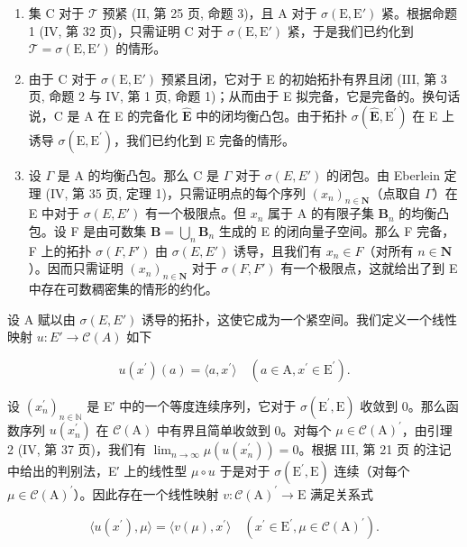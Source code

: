 \begin{enumerate}
\def\labelenumi{\Alph{enumi})}
\item
  集 C 对于 \(\mathcal{T}\) 预紧 (II, 第 25 页, 命题 3)，且 A 对于 \(\sigma(\mathrm{E}, \mathrm{E}')\) 紧。根据命题 1 (IV, 第 32 页)，只需证明 C 对于 \(\sigma(\mathrm{E}, \mathrm{E}')\) 紧，于是我们已约化到 \(\mathcal{T} = \sigma(\mathrm{E}, \mathrm{E}')\) 的情形。
\item
  由于 C 对于 \(\sigma(\mathrm{E}, \mathrm{E}')\) 预紧且闭，它对于 E 的初始拓扑有界且闭 (III, 第 3 页, 命题 2 与 IV, 第 1 页, 命题 1)；从而由于 E 拟完备，它是完备的。换句话说，C 是 A 在 E 的完备化 \(\hat{\mathbf{E}}\) 中的闭均衡凸包。由于拓扑 \(\sigma (\hat{\mathbf{E}},\mathrm{E}^{\prime})\) 在 E 上诱导 \(\sigma (\mathrm{E},\mathrm{E}^{\prime})\)，我们已约化到 E 完备的情形。
\item
  设 \(\Gamma\) 是 A 的均衡凸包。那么 C 是 \(\Gamma\) 对于 \(\sigma(E, E')\) 的闭包。由 Eberlein 定理 (IV, 第 35 页, 定理 1)，只需证明点的每个序列 \((x_n)_{n \in \mathbf{N}}\)（点取自 \(\Gamma\)）在 E 中对于 \(\sigma(E, E')\) 有一个极限点。但 \(x_n\) 属于 A 的有限子集 \(\mathbf{B}_n\) 的均衡凸包。设 F 是由可数集 \(\mathbf{B} = \bigcup_{n} \mathbf{B}_n\) 生成的 E 的闭向量子空间。那么 F 完备，F 上的拓扑 \(\sigma(F, F')\) 由 \(\sigma(E, E')\) 诱导，且我们有 \(x_n \in F\)（对所有 \(n \in \mathbf{N}\)）。因而只需证明 \((x_n)_{n \in \mathbf{N}}\) 对于 \(\sigma(F, F')\) 有一个极限点，这就给出了到 E 中存在可数稠密集的情形的约化。
\end{enumerate}

设 A 赋以由 \(\sigma(E, E')\) 诱导的拓扑，这使它成为一个紧空间。我们定义一个线性映射 \(u: E' \to \mathcal{C}(A)\) 如下

\[
u (x ^ {\prime}) (a) = \langle a, x ^ {\prime} \rangle \quad (a \in \mathrm{A}, x ^ {\prime} \in \mathrm{E} ^ {\prime}).\tag{7}
\]

设 \((x_{n}^{\prime})_{n\in\mathbb{N}}\) 是 E′ 中的一个等度连续序列，它对于 \(\sigma(\mathrm{E}^{\prime},\mathrm{E})\) 收敛到 0。那么函数序列 \(u(x_{n}^{\prime})\) 在 \(\mathcal{C}(\mathrm{A})\) 中有界且简单收敛到 0。对每个 \(\mu\in\mathcal{C}(\mathrm{A})^{\prime}\)，由引理 2 (IV, 第 37 页)，我们有 \(\lim_{n\to\infty}\mu(u(x_{n}^{\prime}))=0\)。根据 III, 第 21 页 的注记中给出的判别法，E′ 上的线性型 \(\mu\circ u\) 于是对于 \(\sigma(\mathrm{E}^{\prime},\mathrm{E})\) 连续（对每个 \(\mu\in\mathcal{C}(\mathrm{A})^{\prime}\)）。因此存在一个线性映射 \(v:\mathcal{C}(\mathrm{A})^{\prime}\to\mathrm{E}\) 满足关系式

\[
\langle u (x ^ {\prime}), \mu \rangle = \langle v (\mu), x ^ {\prime} \rangle \quad \left(x ^ {\prime} \in \mathrm{E} ^ {\prime}, \mu \in \mathcal {C} (\mathrm{A}) ^ {\prime}\right).\tag{8}
\]

